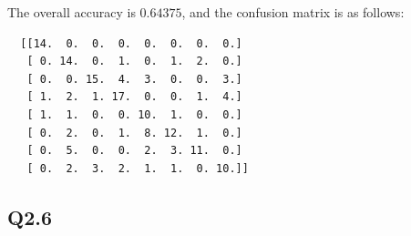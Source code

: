 \documentclass[11pt]{article}
\begin{document}
The overall accuracy is $0.64375$, and the confusion matrix is as follows:

\begin{verbatim}
  [[14.  0.  0.  0.  0.  0.  0.  0.]
   [ 0. 14.  0.  1.  0.  1.  2.  0.]
   [ 0.  0. 15.  4.  3.  0.  0.  3.]
   [ 1.  2.  1. 17.  0.  0.  1.  4.]
   [ 1.  1.  0.  0. 10.  1.  0.  0.]
   [ 0.  2.  0.  1.  8. 12.  1.  0.]
   [ 0.  5.  0.  0.  2.  3. 11.  0.]
   [ 0.  2.  3.  2.  1.  1.  0. 10.]]
\end{verbatim}

\newpage

\subsection*{Q2.6}
\end{document}
